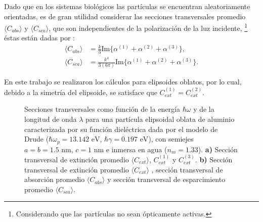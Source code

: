Dado que en los sistemas biológicos las partículas se encuentran aleatoriamente orientadas, es de gran utilidad considerar las secciones transversales promedio $\langle C_{abs}\rangle$ y $\langle C_{sca}\rangle$, que son independientes de la polarización de la luz incidente, \footnote{Considerando que las partículas no sean ópticamente activas.} éstas están dadas por \cite{Bohren}:
\begin{align*}
	\langle C_{abs}\rangle &= \frac{k}{3} \text{Im}\{\alpha^{(1)}+\alpha^{(2)}+\alpha^{(3)}\},\\
	\langle C_{sca}\rangle &= \frac{k^4}{3(6\pi)} \text{Im}\{\alpha^{(1)}+\alpha^{(2)}+\alpha^{(3)}\}.
\end{align*}

En este trabajo se realizaron los cálculos para elipsoides oblatos, por lo cual, debido a la simetría del elipsoide, se satisface que $C_{ext}^{(1)}=C_{ext}^{(2)}$. 

\begin{figure}[h!]
	\quad%
	\caption{Secciones transversales como función de la energía $\hbar\omega$ y de la longitud de onda $\lambda$ para una partícula elipsoidal oblata de aluminio caracterizada por su función dieléctrica dada por el modelo de Drude ($\hbar\omega_p=13.142\text{ eV}$, $\hbar\gamma=0.197\text{ eV}$), con semiejes $a=b=1.5\text{ nm}$, $c=1\text{ nm}$ e inmersa en agua ($n_m=1.33$). \textbf{a)} Sección transversal de extinción promedio $\langle C_{ext}\rangle$, $C_{ext}^{(1)}$  y $C_{ext}^{(3)}$. \textbf{b)} Sección transversal de extinción promedio $\langle C_{ext}\rangle$ , sección transversal de absorción promedio $\langle C_{abs}\rangle$ y sección transversal de esparcimiento promedio $\langle C_{sca}\rangle$.} \label{fig:test}
\end{figure}

